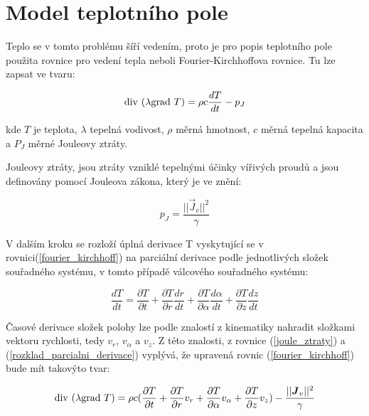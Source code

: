 \newpage

\section{Model teplotního pole}
Teplo se v tomto problému šíří vedením, proto je pro popis teplotního pole použita rovnice pro vedení tepla neboli Fourier-Kirchhoffova rovnice. Tu lze zapsat ve tvaru:

\begin{equation}
	\mathrm{div}\  ( \lambda  \mathrm{grad}\  T) = \rho c \frac{dT}{dt} - p_J 
	\label{fourier_kirchhoff} 
\end{equation} \cite{TZEP}

kde $T$ je teplota, $\lambda$ tepelná vodivost, $\rho$ měrná hmotnost, $c$ měrná tepelná kapacita a   $P_J$ měrné Jouleovy ztráty.

Jouleovy ztráty, jsou ztráty vzniklé tepelnými účinky vířivých proudů a jsou definovány pomocí Jouleova zákona, který je ve znění:

\begin{equation}
	p_{J}=\frac{||\vec{J}_{v}||^{2}}{\gamma}
	\label{joule_ztraty} 
\end{equation} 

V dalším kroku se rozloží úplná derivace T vyskytující se v rovnici(\ref{fourier_kirchhoff}) na parciální derivace podle jednotlivých složek souřadného systému, v tomto případě válcového souřadného systému:

\begin{equation}
	\frac{dT}{dt} =\frac{\partial T}{\partial t} + \frac{\partial T}{\partial r} \frac{d r}{d t} + \frac{\partial T}{\partial \alpha} \frac{d \alpha}{d t} + \frac{\partial T}{\partial z} \frac{d z}{d t}
	\label{rozklad_parcialni_derivace} 
\end{equation}

Časové derivace složek polohy lze podle znalostí z kinematiky nahradit složkami vektoru rychlosti, tedy $v_r$, $v_\alpha$ a $v_z$. Z této znalosti, z rovnice (\ref{joule_ztraty}) a (\ref{rozklad_parcialni_derivace}) vyplývá, že upravená rovnic (\ref{fourier_kirchhoff}) bude mít takovýto tvar:

\begin{equation}
	\mathrm{div}\  ( \lambda  \mathrm{grad}\  T) = \rho c (\frac{\partial T}{\partial t} + \frac{\partial T}{\partial r} v_r + \frac{\partial T}{\partial \alpha} v_\alpha + \frac{\partial T}{\partial z} v_z) - \frac{||\mbox{\boldmath$J$}_{v}||^{2}}{\gamma}
	\label{fourier_kirchhoff_upraven} 
\end{equation} 


